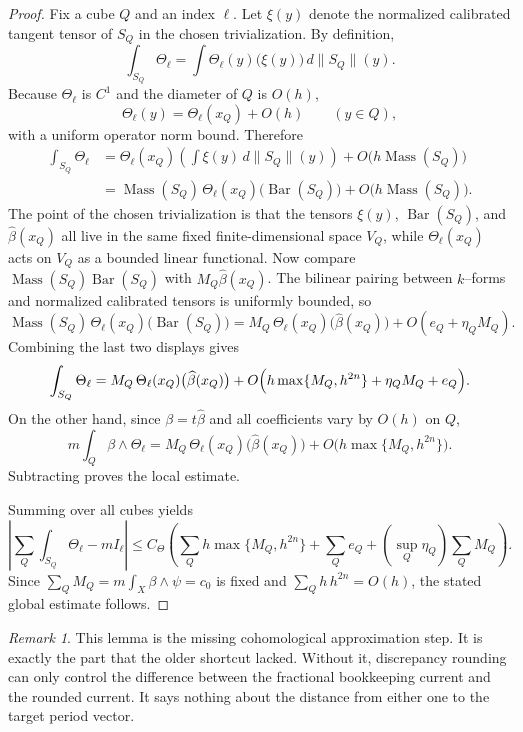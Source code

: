 \documentclass[11pt]{article}
\numberwithin{equation}{section}
\theoremstyle{plain}
\theoremstyle{definition}
\theoremstyle{remark}
\newtheorem{remark}[theorem]{Remark}
\DeclareMathOperator{\Mass}{Mass}
\newcommand{\Bary}{\operatorname{Bar}}
\begin{document}
\begin{proof}
Fix a cube $Q$ and an index $\ell$.  Let $\xi(y)$ denote the normalized calibrated tangent tensor of $S_Q$ in the chosen trivialization.  By definition,
\[
\int_{S_Q}\Theta_\ell
=
\int \Theta_\ell(y)\bigl(\xi(y)\bigr)\,d\|S_Q\|(y).
\]
Because $\Theta_\ell$ is $C^1$ and the diameter of $Q$ is $O(h)$,
\[
\Theta_\ell(y)=\Theta_\ell(x_Q)+O(h)
\qquad (y\in Q),
\]
with a uniform operator norm bound.  Therefore
\[
\begin{aligned}
\int_{S_Q}\Theta_\ell
&=
\Theta_\ell(x_Q)\left(\int \xi(y)\,d\|S_Q\|(y)\right)+O\bigl(h\Mass(S_Q)\bigr) \\
&=
\Mass(S_Q)\,\Theta_\ell(x_Q)\bigl(\Bary(S_Q)\bigr)+O\bigl(h\Mass(S_Q)\bigr).
\end{aligned}
\]
The point of the chosen trivialization is that the tensors $\xi(y)$, $\Bary(S_Q)$,
and $\widehat\beta(x_Q)$ all live in the same fixed finite-dimensional space
$V_Q$, while $\Theta_\ell(x_Q)$ acts on $V_Q$ as a bounded linear functional.
Now compare $\Mass(S_Q)\Bary(S_Q)$ with $M_Q\widehat\beta(x_Q)$.  The bilinear pairing between $k$--forms and normalized calibrated tensors is uniformly bounded, so
\[
\Mass(S_Q)\,\Theta_\ell(x_Q)\bigl(\Bary(S_Q)\bigr)
=
M_Q\,\Theta_\ell(x_Q)\bigl(\widehat\beta(x_Q)\bigr)+O(e_Q+\eta_Q M_Q).
\]
Combining the last two displays gives
\[
\int_{S_Q}\Theta_\ell
=
M_Q\,\Theta_\ell(x_Q)\bigl(\widehat\beta(x_Q)\bigr)
+O\Bigl(h\max\{M_Q,h^{2n}\}+\eta_Q M_Q+e_Q\Bigr).
\]
On the other hand, since $\beta=t\widehat\beta$ and all coefficients vary by $O(h)$ on $Q$,
\[
m\int_Q \beta\wedge\Theta_\ell
=
M_Q\,\Theta_\ell(x_Q)\bigl(\widehat\beta(x_Q)\bigr)
+O\bigl(h\max\{M_Q,h^{2n}\}\bigr).
\]
Subtracting proves the local estimate.

Summing over all cubes yields
\[
\left|\sum_Q\int_{S_Q}\Theta_\ell - mI_\ell\right|
\le
C_\Theta\left(\sum_Q h\max\{M_Q,h^{2n}\}+\sum_Q e_Q + (\sup_Q\eta_Q)\sum_Q M_Q\right).
\]
Since $\sum_Q M_Q=m\int_X \beta\wedge\psi=c_0$ is fixed and $\sum_Q h\,h^{2n}=O(h)$, the stated global estimate follows.
\end{proof}

\begin{remark}
This lemma is the missing cohomological approximation step.  It is exactly the part that the older shortcut lacked.  Without it, discrepancy rounding can only control the difference between the fractional bookkeeping current and the rounded current.  It says nothing about the distance from either one to the target period vector.
\end{remark}
\end{document}
